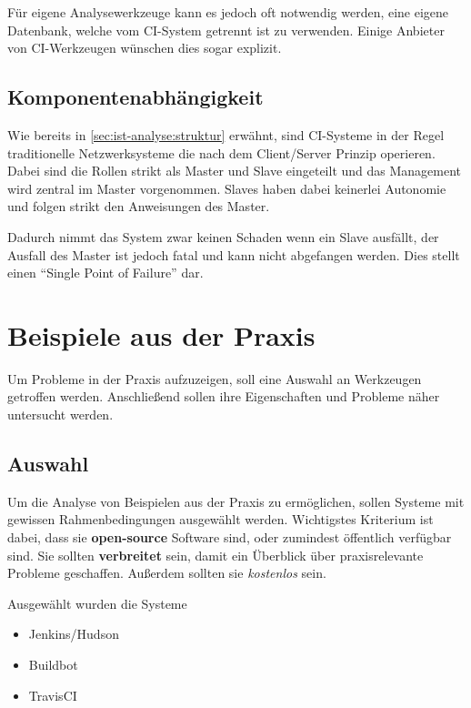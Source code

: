 Für eigene Analysewerkzeuge kann es jedoch oft notwendig werden,
eine eigene Datenbank, welche vom CI-System getrennt ist zu verwenden.
Einige Anbieter von CI-Werkzeugen wünschen dies sogar explizit.


\subsection{Komponentenabhängigkeit}

Wie bereits in \cref{sec:ist-analyse:struktur} erw\"ahnt,
sind CI-Systeme in der Regel traditionelle Netzwerksysteme die nach dem Client/Server Prinzip operieren.
Dabei sind die Rollen strikt als Master und Slave eingeteilt
und das Management wird zentral im Master vorgenommen.
Slaves haben dabei keinerlei Autonomie und folgen strikt den Anweisungen des Master.

Dadurch nimmt das System zwar keinen Schaden wenn ein Slave ausfällt,
der Ausfall des Master ist jedoch fatal und kann nicht abgefangen werden.
Dies stellt einen ``Single Point of Failure'' dar.


\section{Beispiele aus der Praxis}

Um Probleme in der Praxis aufzuzeigen,
soll eine Auswahl an Werkzeugen getroffen werden.
Anschließend sollen ihre Eigenschaften und Probleme
näher untersucht werden.


\subsection{Auswahl}

Um die Analyse von Beispielen aus der Praxis zu ermöglichen,
sollen Systeme mit gewissen Rahmenbedingungen ausgew\"ahlt werden.
Wichtigstes Kriterium ist dabei, dass sie \textbf{open-source} Software sind,
oder zumindest öffentlich verfügbar sind.
Sie sollten \textbf{verbreitet} sein, damit ein Überblick
über praxisrelevante Probleme geschaffen.
Außerdem sollten sie \textit{kostenlos} sein. %

Ausgewählt wurden die Systeme
\begin{itemize}
  \item Jenkins/Hudson
  \item Buildbot
  \item TravisCI
\end{itemize}

